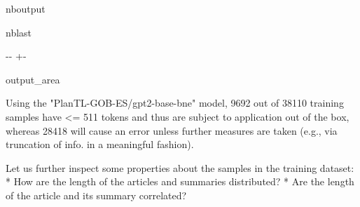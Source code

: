 \documentclass[letterpaper,10pt,english]{sphinxmanual}
\newlength\nbsphinxcodecellspacing
\begin{document}
\begin{sphinxuseclass}{nboutput}
\begin{sphinxuseclass}{nblast}
{

\kern-\sphinxverbatimsmallskipamount\kern-\baselineskip
\kern+\FrameHeightAdjust\kern-\fboxrule
\vspace{\nbsphinxcodecellspacing}

\begin{sphinxuseclass}{output_area}
\begin{sphinxuseclass}{}


\begin{sphinxVerbatim}[commandchars=\\\{\}]
Using the "PlanTL-GOB-ES/gpt2-base-bne" model, 9692 out of 38110 training samples have <= 511 tokens and thus are subject to application out of the box, whereas 28418 will cause an error unless further measures are taken (e.g., via truncation of info. in a meaningful fashion).
\end{sphinxVerbatim}



\end{sphinxuseclass}
\end{sphinxuseclass}
}

\end{sphinxuseclass}
\end{sphinxuseclass}
\sphinxAtStartPar
Let us further inspect some properties about the samples in the training dataset: * How are the length of the articles and summaries distributed? * Are the length of the article and its summary correlated?
\end{document}
